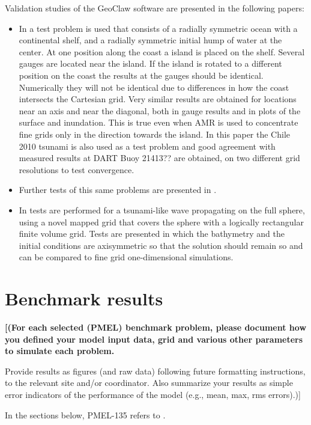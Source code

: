 \documentclass[11pt]{article}
\newcommand{\todo}[1]{{\bf \color{blue} [#1]}}
\begin{document}
Validation studies of the GeoClaw software are presented in the following
papers:

\begin{itemize}
\item In \cite{BergerGeorgeLeVequeMandli:awr10} a test problem is used that
consists of a radially symmetric ocean with a continental shelf, and
a radially symmetric initial
hump of water at the center.  At one position along the coast a 
island is placed on the shelf.  Several gauges are located near the island.
If the island is rotated to a different position on the coast the results at
the gauges should be identical.  Numerically they will not be identical due
to differences in how the coast intersects the Cartesian grid.  Very similar
results are obtained for locations near an axis and near the diagonal, both
in gauge results and in plots of the surface and inundation.  This is true
even when AMR is used to concentrate fine grids only in the direction
towards the island.  In this paper the Chile 2010 tsunami is also used as a
test problem and good agreement with measured results at DART Buoy 21413??
are obtained, on two different grid resolutions to test convergence.

\item Further tests of this same problems are presented in
\cite{LeVequeGeorgeBerger:an11}.  

\item In \cite{mjb-dac-ch-rjl:amrsphere09} tests are performed for a
tsunami-like wave propagating on the full sphere, using a novel mapped grid
that covers the sphere with a logically rectangular finite volume grid.
Tests are presented in which the bathymetry and the initial conditions are
axisymmetric so that the solution should remain so and can be compared to
fine grid one-dimensional simulations.  
\end{itemize} 




\section{Benchmark results}
\todo{(For each selected (PMEL) benchmark problem, please document how you defined
your model input data, grid and various other parameters to simulate each
problem. 

Provide results as figures (and raw data) following future formatting
instructions, to the relevant site and/or coordinator. Also summarize your
results as simple error indicators of the performance of the model (e.g.,
mean, max, rms errors).)}

In the sections below,
PMEL-135 refers to \cite{SynolakisBernard:pmel135}.
















\end{document}
